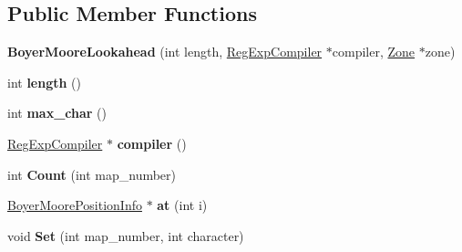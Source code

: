 \subsection*{Public Member Functions}
\begin{DoxyCompactItemize}
\item 
{\bfseries Boyer\+Moore\+Lookahead} (int length, \hyperlink{classv8_1_1internal_1_1_reg_exp_compiler}{Reg\+Exp\+Compiler} $\ast$compiler, \hyperlink{classv8_1_1internal_1_1_zone}{Zone} $\ast$zone)\hypertarget{classv8_1_1internal_1_1_boyer_moore_lookahead_ab6a48b1e2e6882f08b2b6675ff8df09c}{}\label{classv8_1_1internal_1_1_boyer_moore_lookahead_ab6a48b1e2e6882f08b2b6675ff8df09c}

\item 
int {\bfseries length} ()\hypertarget{classv8_1_1internal_1_1_boyer_moore_lookahead_adf8931d50830d985a1423b6b1b8612db}{}\label{classv8_1_1internal_1_1_boyer_moore_lookahead_adf8931d50830d985a1423b6b1b8612db}

\item 
int {\bfseries max\+\_\+char} ()\hypertarget{classv8_1_1internal_1_1_boyer_moore_lookahead_aa29b6ac73eb53c5bfce5be63b0a7ebd5}{}\label{classv8_1_1internal_1_1_boyer_moore_lookahead_aa29b6ac73eb53c5bfce5be63b0a7ebd5}

\item 
\hyperlink{classv8_1_1internal_1_1_reg_exp_compiler}{Reg\+Exp\+Compiler} $\ast$ {\bfseries compiler} ()\hypertarget{classv8_1_1internal_1_1_boyer_moore_lookahead_aa9e74726e490b7e55d846bfbf9117b74}{}\label{classv8_1_1internal_1_1_boyer_moore_lookahead_aa9e74726e490b7e55d846bfbf9117b74}

\item 
int {\bfseries Count} (int map\+\_\+number)\hypertarget{classv8_1_1internal_1_1_boyer_moore_lookahead_a59acc100fba6e91982d56037e23430a2}{}\label{classv8_1_1internal_1_1_boyer_moore_lookahead_a59acc100fba6e91982d56037e23430a2}

\item 
\hyperlink{classv8_1_1internal_1_1_boyer_moore_position_info}{Boyer\+Moore\+Position\+Info} $\ast$ {\bfseries at} (int i)\hypertarget{classv8_1_1internal_1_1_boyer_moore_lookahead_a966ed7328590844feb533c01078ad12f}{}\label{classv8_1_1internal_1_1_boyer_moore_lookahead_a966ed7328590844feb533c01078ad12f}

\item 
void {\bfseries Set} (int map\+\_\+number, int character)\hypertarget{classv8_1_1internal_1_1_boyer_moore_lookahead_af4c7e21eb752bb01e83017365c1f9df0}{}\label{classv8_1_1internal_1_1_boyer_moore_lookahead_af4c7e21eb752bb01e83017365c1f9df0}


\end{DoxyCompactItemize}
